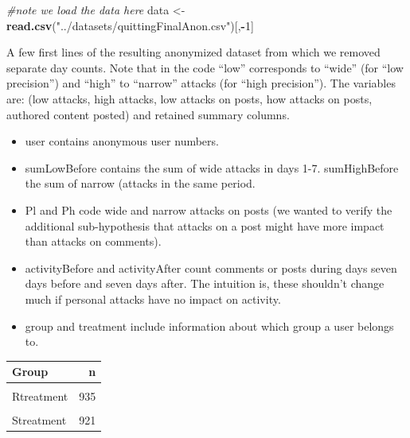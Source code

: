 \documentclass[10pt,]{scrartcl}
\newenvironment{Shaded}{\begin{snugshade}}{\end{snugshade}}
\newcommand{\KeywordTok}[1]{\textcolor[rgb]{0.13,0.29,0.53}{\textbf{#1}}}
\newcommand{\DecValTok}[1]{\textcolor[rgb]{0.00,0.00,0.81}{#1}}
\newcommand{\StringTok}[1]{\textcolor[rgb]{0.31,0.60,0.02}{#1}}
\newcommand{\CommentTok}[1]{\textcolor[rgb]{0.56,0.35,0.01}{\textit{#1}}}
\newcommand{\OperatorTok}[1]{\textcolor[rgb]{0.81,0.36,0.00}{\textbf{#1}}}
\newcommand{\NormalTok}[1]{#1}
\begin{document}
\footnotesize

\begin{Shaded}
\begin{Highlighting}[]
\CommentTok{#note we load the data here}
\NormalTok{data <-}\StringTok{ }\KeywordTok{read.csv}\NormalTok{(}\StringTok{"../datasets/quittingFinalAnon.csv"}\NormalTok{)[,}\OperatorTok{-}\DecValTok{1}\NormalTok{]}
\end{Highlighting}
\end{Shaded}

\normalsize

A few first lines of the resulting anonymized dataset from which we
removed separate day counts. Note that in the code ``low'' corresponds
to ``wide'' (for ``low precision'') and ``high'' to ``narrow'' attacks
(for ``high precision''). The variables are: (low attacks, high attacks,
low attacks on posts, how attacks on posts, authored content posted) and
retained summary columns.

\begin{itemize}

\item \textsf{user} contains anonymous user numbers.
\item \textsf{sumLowBefore} contains the sum of \textsf{wide}  attacks in days 1-7. \textsf{sumHighBefore} the sum of \textsf{narrow} (attacks in the same period. 
\item \textsf{Pl} and \textsf{Ph} code \textsf{wide} and \textsf{narrow} attacks on posts (we wanted to verify the additional sub-hypothesis that  attacks on a post might have more impact than attacks on comments).

\item \textsf{activityBefore} and \textsf{activityAfter} count comments or posts during days seven days before and seven days after. The intuition is, these shouldn't change much if personal attacks have  no impact on activity.

\item \textsf{group} and \textsf{treatment} include information about which group a user belongs to.

\end{itemize}

\footnotesize 

\begin{table}
\centering\begingroup\fontsize{9}{11}\selectfont

\begin{tabular}{lr}
\toprule
Group & n\\
\midrule
\cellcolor{gray!6}{Rcontrol} & \cellcolor{gray!6}{875}\\
Rtreatment & 935\\
\cellcolor{gray!6}{Scontrol} & \cellcolor{gray!6}{942}\\
Streatment & 921\\
\bottomrule
\end{tabular}
\endgroup{}
\end{table}
\end{document}
